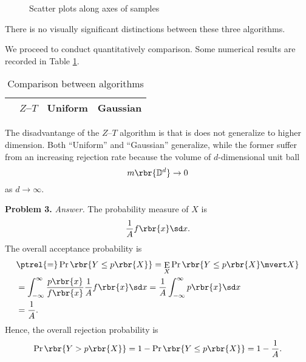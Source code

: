 \documentclass[english, nochinese]{pnote}
\DeclareMathOperator\oppr{\mathrm{Pr}}
\DeclareMathOperator\ope{\mathrm{E}}
\begin{document}
\begin{figure}[htb]
\centering
\scalebox{0.7}{}
\scalebox{0.7}{}
\caption{Scatter plots along axes of samples}
\label{Fig:2D}
\end{figure}

There is no visually significant distinctions between these three algorithms.

We proceed to conduct quantitatively comparison. Some numerical results are recorded in Table \ref{Tbl:Res}.

\begin{table}[htb]
\centering
\begin{tabular}{|c|c|c|c|}
\hline
& $Z$--$T$ & Uniform & Gaussian \\
\hline

\end{tabular}
\caption{Comparison between algorithms}
\label{Tbl:Res}
\end{table}

The disadvantange of the $Z$--$T$ algorithm is that is does not generalize to higher dimension. Both ``Uniform'' and ``Gaussian'' generalize, while the former suffer from an increasing rejection rate because the volume of $d$-dimensional unit ball
\begin{equation}
m \rbr{\mathbb{D}^d} \rightarrow 0 
\end{equation}
as $ d \rightarrow \infty $.

\textbf{Problem 3.} \textit{Answer.} The probability measure of $X$ is
\begin{equation}
\frac{1}{A} f \rbr{x} \sd x.
\end{equation}
The overall acceptance probability is
\begin{equation}
\begin{split}
&\ptrel{=} \oppr \rbr{ Y \le p \rbr{X} } = \ope_X \oppr \rbr{ Y \le p \rbr{X} \mvert X } \\
&= \int_{-\infty}^{\infty} \frac{ p \rbr{x} }{ f \rbr{x} } \frac{1}{A} f \rbr{x} \sd x = \frac{1}{A} \int_{-\infty}^{\infty} p \rbr{x} \sd x \\
&= \frac{1}{A}.
\end{split}
\end{equation}
Hence, the overall rejection probability is
\begin{equation}
\oppr \rbr{ Y > p \rbr{X} } = 1 - \oppr \rbr{ Y \le p \rbr{X} } = 1 - \frac{1}{A}.
\end{equation}
\end{document}
